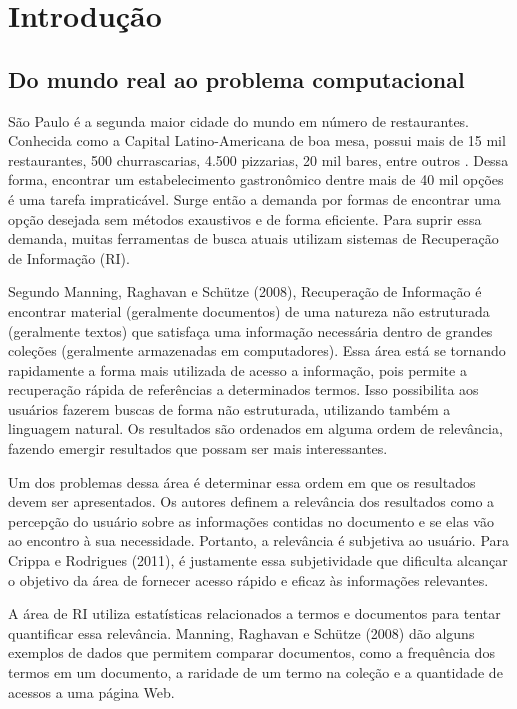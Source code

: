 \chapter{Introdução}
\label{cap:introducao}

\section*{Do mundo real ao problema computacional}
\label{sec:real_computacional}

São Paulo é a segunda maior cidade do mundo em número de restaurantes. Conhecida como a Capital Latino-Americana de boa mesa, possui mais de 15 mil restaurantes, 500 churrascarias, 4.500 pizzarias, 20 mil bares, entre outros \cite{VisiteSaoPaulo}. Dessa forma, encontrar um estabelecimento gastronômico dentre mais de 40 mil opções é uma tarefa impraticável. Surge então a demanda por formas de encontrar uma opção desejada sem métodos exaustivos e de forma eficiente. Para suprir essa demanda, muitas ferramentas de busca atuais utilizam sistemas de Recuperação de Informação (RI).

Segundo Manning, Raghavan e Schütze (2008), Recuperação de Informação é encontrar material (geralmente documentos) de uma natureza não estruturada (geralmente textos) que satisfaça uma informação necessária dentro de grandes coleções (geralmente armazenadas em computadores). Essa área está se tornando rapidamente a forma mais utilizada de acesso a informação, pois permite a recuperação rápida de referências a determinados termos. Isso possibilita aos usuários fazerem buscas de forma não estruturada, utilizando também a linguagem natural. Os resultados são ordenados em alguma ordem de relevância, fazendo emergir resultados que possam ser mais interessantes.

Um dos problemas dessa área é determinar essa ordem em que os resultados devem ser apresentados. Os autores definem a relevância dos resultados como a percepção do usuário sobre as informações contidas no documento e se elas vão ao encontro à sua necessidade. Portanto, a relevância é subjetiva ao usuário. Para Crippa e Rodrigues (2011), é justamente essa subjetividade que dificulta alcançar o objetivo da área de fornecer acesso rápido e eficaz às informações relevantes.

A área de RI utiliza estatísticas relacionados a termos e documentos para tentar quantificar essa relevância. Manning, Raghavan e Schütze (2008) dão alguns exemplos de dados que permitem comparar documentos, como a frequência dos termos em um documento, a raridade de um termo na coleção e a quantidade de acessos a uma página Web.

